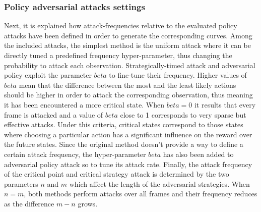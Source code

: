 \subsubsection{Policy adversarial attacks settings}
Next, it is explained how attack-frequencies relative to the evaluated policy attacks have been defined in order to generate the corresponding curves. Among the included attacks, the simplest method is the uniform attack where it can be directly tuned a predefined frequency hyper-parameter, thus changing the probability to attack each observation. Strategically-timed attack and adversarial policy exploit the parameter \(beta\) to fine-tune their frequency. Higher values of \(beta\) mean that the difference between the most and the least likely actions should be higher in order to attack the corresponding observation, thus meaning it has been encountered a more critical state. When \(beta=0\) it results that every frame is attacked and a value of \(beta\) close to 1 corresponds to very sparse but effective attacks. Under this criteria, critical states correspond to those states where choosing a particular action has a significant influence on the reward over the future states. Since the original method doesn't provide a way to define a certain attack frequency, the hyper-parameter \(beta\) has also been added to adversarial policy attack so to tune its attack rate. Finally, the attack frequency of the critical point and critical strategy attack is determined by the two parameters \(n\) and \(m\) which affect the length of the adversarial strategies. When \(n=m\), both methods perform attacks over all frames and their frequency reduces as the difference \(m-n\) grows.

